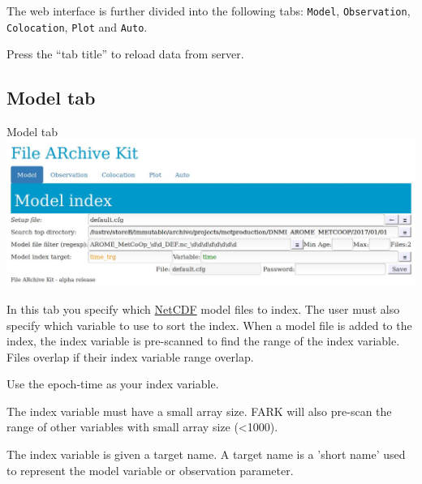\documentclass[letterpaper,10pt,twoside,twocolumn,openany]{book}
\begin{document}
The web interface is further divided into the following tabs: \lstinline!Model!, \lstinline!Observation!, \lstinline!Colocation!, 
\lstinline!Plot! and \lstinline!Auto!.

\begin{quotebox}
Press the ``tab title'' to reload data from server.
\end{quotebox}

\subsection{Model tab}

\begin{paperbox}{Model tab}
  \includegraphics[width=\columnwidth]{fark_model.jpg}
\end{paperbox}
In this tab you specify which \hyperlink{netcdf}{NetCDF} model files to index.
The user must also specify which variable to use to sort the index.
When a model file is added to the index, the index variable is pre-scanned to 
find the range of the index variable. 
Files overlap if their index variable range overlap.
\begin{quotebox}
Use the epoch-time as your index variable.
\end{quotebox}
The index variable must have a small array size. 
FARK will also pre-scan the range of other variables with small array size (<1000).

The index variable is given a target name.
A target name is a 'short name' used to
represent the model variable or observation 
parameter.
\end{document}
